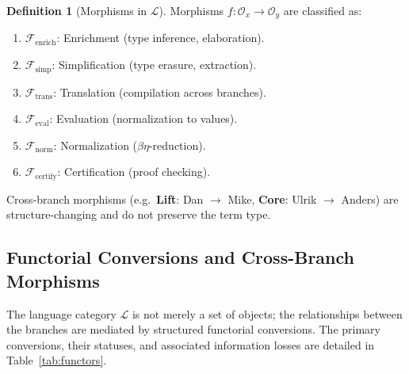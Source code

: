 \documentclass{article}
\theoremstyle{definition}
\newtheorem{definition}{Definition}[section]
\theoremstyle{plain}
\begin{document}
\newpage

\begin{definition}[Morphisms in $\mathcal{L}$]
Morphisms $f : \mathcal{O}_x \to \mathcal{O}_y$ are classified as:
\begin{enumerate}
    \item $\mathcal{F}_{\mathrm{enrich}}$: Enrichment (type inference, elaboration).
    \item $\mathcal{F}_{\mathrm{simp}}$: Simplification (type erasure, extraction).
    \item $\mathcal{F}_{\mathrm{trans}}$: Translation (compilation across branches).
    \item $\mathcal{F}_{\mathrm{eval}}$: Evaluation (normalization to values).
    \item $\mathcal{F}_{\mathrm{norm}}$: Normalization ($\beta\eta$-reduction).
    \item $\mathcal{F}_{\mathrm{certify}}$: Certification (proof checking).
\end{enumerate}
Cross-branch morphisms (e.g.\ \textbf{Lift}: Dan $\to$ Mike, \textbf{Core}:
Ulrik $\to$ Anders) are structure-changing and do not preserve the term type.
\end{definition}

\subsection{Functorial Conversions and Cross-Branch Morphisms}
The language category $\mathcal{L}$ is not merely a set of objects;
the relationships between the branches are mediated by structured functorial conversions.
The primary conversions, their statuses, and associated information losses are detailed in Table~\ref{tab:functors}.
\end{document}
